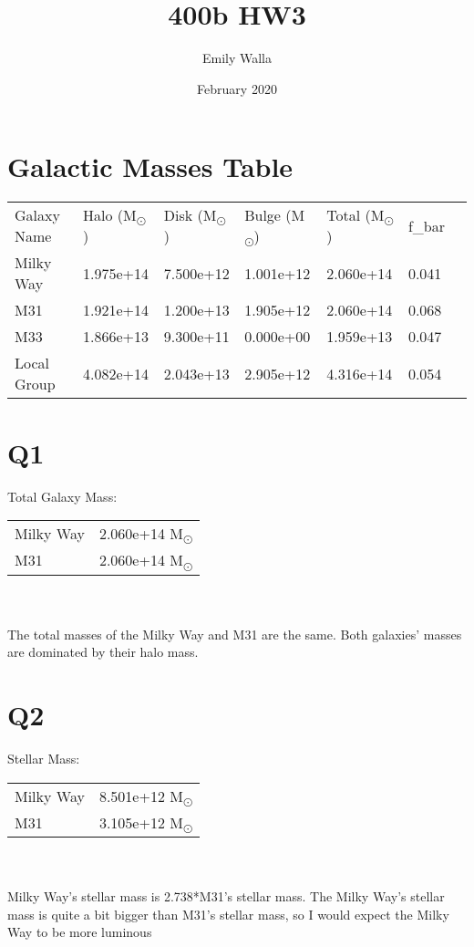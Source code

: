 \documentclass{article}
\title{400b HW3}
\author{Emily Walla}
\date{February 2020}
\begin{document}
\maketitle
\section{Galactic Masses Table}

\begin{tabular}{lllllll}

  Galaxy Name &  Halo (M\textsubscript{\(\odot\)}) &  Disk (M\textsubscript{\(\odot\)}) &  Bulge (M\textsubscript{\(\odot\)}) &  Total (M\textsubscript{\(\odot\)}) &     f\_bar \\

   Milky Way &       1.975e+14 &       7.500e+12 &        1.001e+12 &   2.060e+14 &  0.041 \\
         M31 &       1.921e+14 &       1.200e+13 &        1.905e+12 &   2.060e+14 &  0.068 \\
         M33 &       1.866e+13 &       9.300e+11 &        0.000e+00 &   1.959e+13 &  0.047 \\
 Local Group &       4.082e+14 &       2.043e+13 &        2.905e+12 &   4.316e+14 &  0.054\\
\end{tabular}

\section{Q1}

Total Galaxy Mass:
\\
\begin{tabular}{ll}

Milky Way &     2.060e+14 M\textsubscript{\(\odot\)} \\
M31 &     2.060e+14 M\textsubscript{\(\odot\)}


\end{tabular}
\\
\\
The total masses of the Milky Way and M31 are the same.  Both galaxies' masses are dominated by their halo mass.

\section{Q2}

Stellar Mass:
\\
\begin{tabular}{ll}

Milky Way &     8.501e+12 M\textsubscript{\(\odot\)} \\
M31 &     3.105e+12 M\textsubscript{\(\odot\)}

\end{tabular}
\\
\\
Milky Way's stellar mass is 2.738*M31's stellar mass.
The Milky Way's stellar mass is quite a bit bigger than M31's stellar mass, so I would expect the Milky Way to be more luminous
\end{document}
